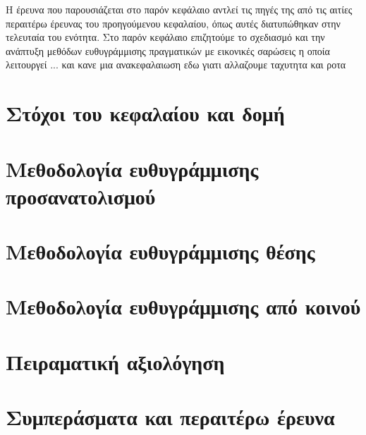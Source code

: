 Η έρευνα που παρουσιάζεται στο παρόν κεφάλαιο αντλεί τις πηγές της από τις
αιτίες περαιτέρω έρευνας του προηγούμενου κεφαλαίου, όπως αυτές διατυπώθηκαν
στην τελευταία του ενότητα. Στο παρόν κεφάλαιο επιζητούμε το σχεδιασμό και
την ανάπτυξη μεθόδων ευθυγράμμισης πραγματικών με εικονικές σαρώσεις η οποία
λειτουργεί ... και κανε μια ανακεφαλαιωση εδω γιατι αλλαζουμε ταχυτητα και ροτα



\section{Στόχοι του κεφαλαίου και δομή}
  \label{section:02_04_01}
  

\section{Μεθοδολογία ευθυγράμμισης προσανατολισμού}
  \label{section:02_04_02}
  

\section{Μεθοδολογία ευθυγράμμισης θέσης}
  \label{section:02_04_03}
  

\section{Μεθοδολογία ευθυγράμμισης από κοινού}
  \label{section:02_04_04}
  

\section{Πειραματική αξιολόγηση}
  \label{section:02_04_05}
  

\section{Συμπεράσματα και περαιτέρω έρευνα}
  \label{section:02_04_06}
  

